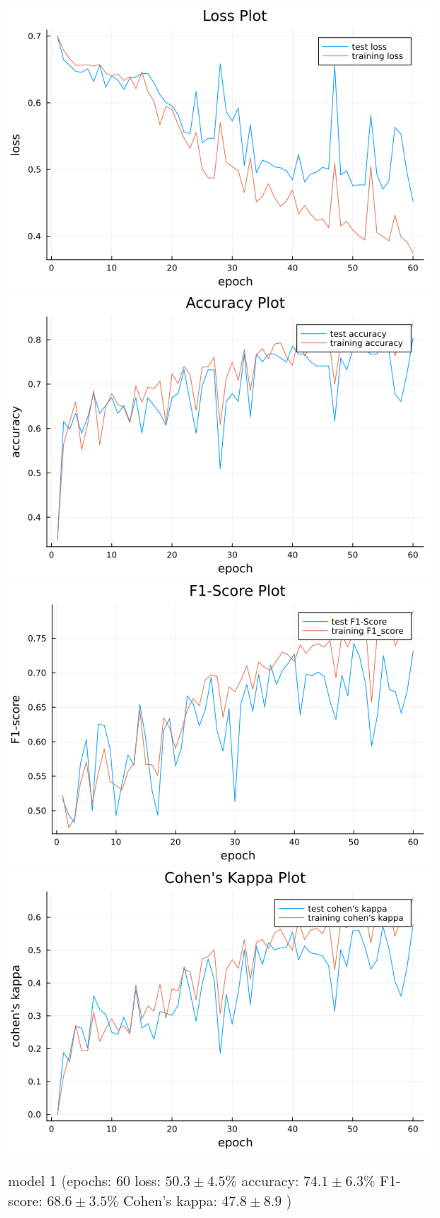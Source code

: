 \documentclass[
a4paper, 
12pt,
grayscalebody, %
abstract=on,
twoside, BCOR10mm, 12pt, DIV13,headinclude, footexclude, final, abstracton, openright
]{ibireprt}
\numberwithin{equation}{chapter}
\numberwithin{table}{chapter}
\numberwithin{figure}{chapter}
\numberwithin{algorithm}{chapter}
\numberwithin{example}{chapter}
\numberwithin{example}{chapter}
\begin{document}
\begin{figure}
	\includegraphics[width=0.4\linewidth]{loss_png_final_1_1.png}\hfill
	\includegraphics[width=0.4\linewidth]{accuracy_png_final_1_1.png}
	\\[\smallskipamount]
	\includegraphics[width=0.4\linewidth]{f1_score_png_final_1_1.png}\hfill
	\includegraphics[width=0.4\linewidth]{cohens_kappa_png_final_1_1.png}
	\caption{model 1 (epochs: 60 loss: $50.3 \pm 4.5\% $ accuracy: $74.1 \pm6.3\%$ F1-score: $68.6 \pm3.5\%$  Cohen's kappa: $47.8\pm8.9$ )}
	\label{fig:model_1_60}
\end{figure}
\end{document}
